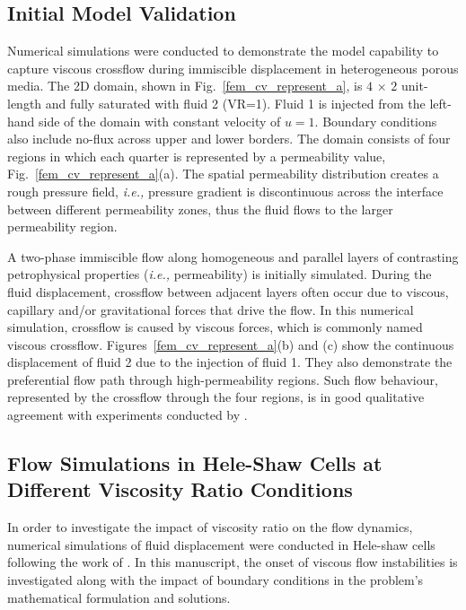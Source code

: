 \documentclass[preprint,authoryear,12pt]{elsarticle}
\newcommand{\ie}{{\it i.e., }}
\begin{document}
\subsection{Initial Model Validation}\label{section:results_initial_model_validation}
Numerical simulations \citep[based on lab experiments due to][]{evans_1994,dawe_2008} were conducted to demonstrate the model capability to capture viscous crossflow during immiscible displacement in heterogeneous porous media. The 2D domain, shown in Fig.~\ref{fem_cv_represent_a}, is $4$ $\times$ $2$ unit-length and fully saturated with fluid 2 (VR=1). Fluid 1 is injected from the left-hand side of the domain with constant velocity of $u=1$. Boundary conditions also include no-flux across upper and lower borders. The domain consists of four regions in which each quarter is represented by a permeability value, Fig.~\ref{fem_cv_represent_a}(a). The spatial permeability distribution creates a rough pressure field, \ie pressure gradient is discontinuous across the interface between different permeability zones, thus the fluid flows to the larger permeability region. %

\medskip
A two-phase immiscible flow along homogeneous and parallel layers of contrasting petrophysical properties (\ie permeability) is initially simulated. During the fluid displacement, crossflow between adjacent layers often occur due to viscous, capillary and/or gravitational forces that drive the flow. In this numerical simulation, crossflow is caused by viscous forces, which is commonly named viscous crossflow. Figures~\ref{fem_cv_represent_a}(b) and (c) show the continuous displacement of fluid 2 due to the injection of fluid 1. They also demonstrate the preferential flow path through high-permeability regions. Such flow behaviour, represented by the crossflow through the four regions, is in good qualitative agreement with experiments conducted by \citet{dawe_2008}. 


\subsection{Flow Simulations in Hele-Shaw Cells at Different Viscosity Ratio Conditions}\label{section:results_homo_hete} 
In order to investigate the impact of viscosity ratio on the flow dynamics, numerical simulations of fluid displacement were conducted in Hele-shaw cells following the work of \citet{saffman_1986}. In this manuscript, the onset of viscous flow instabilities \citep[following his seminal work in][]{saffman_1958} is investigated along with the impact of boundary conditions in the problem's mathematical formulation and solutions. 
\end{document}
